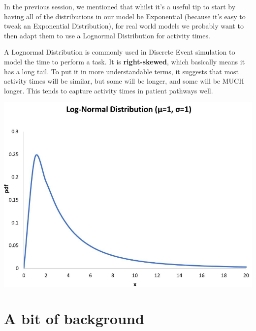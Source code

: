 \documentclass[
  letterpaper,
  DIV=11,
  numbers=noendperiod]{scrreprt}
\begin{document}
In the previous session, we mentioned that whilst it's a useful tip to
start by having all of the distributions in our model be Exponential
(because it's easy to tweak an Exponential Distribution), for real world
models we probably want to then adapt them to use a Lognormal
Distribution for activity times.

A Lognormal Distribution is commonly used in Discrete Event simulation
to model the time to perform a task. It is \textbf{right-skewed}, which
basically means it has a long tail. To put it in more understandable
terms, it suggests that most activity times will be similar, but some
will be longer, and some will be MUCH longer. This tends to capture
activity times in patient pathways well.

\includegraphics{images/lognormal.png}

\section{A bit of background}\label{a-bit-of-background}
\end{document}

